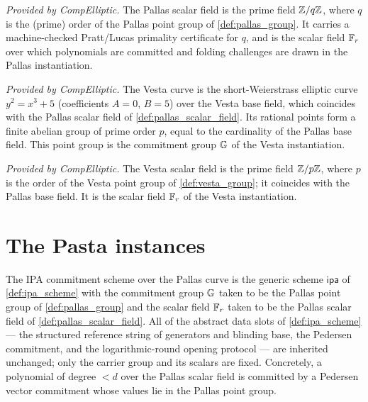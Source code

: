 \begin{definition}
  \label{def:pallas_scalar_field}
  \mathlibok
  \textit{Provided by CompElliptic.}
  The Pallas scalar field is the prime field \(\mathbb{Z}/q\mathbb{Z}\), where \(q\) is the
  (prime) order of the Pallas point group of \cref{def:pallas_group}. It carries a
  machine-checked Pratt/Lucas primality certificate for \(q\), and is the scalar
  field \(\mathbb{F}_r\) over which polynomials are committed and folding challenges are
  drawn in the Pallas instantiation.
\end{definition}

\begin{definition}
  \label{def:vesta_group}
  \mathlibok
  \textit{Provided by CompElliptic.}
  The Vesta curve is the short-Weierstrass elliptic curve \(y^{2} = x^{3} + 5\)
  (coefficients \(A = 0\), \(B = 5\)) over the Vesta base field, which coincides
  with the Pallas scalar field of \cref{def:pallas_scalar_field}. Its rational
  points form a finite abelian group of prime order \(p\), equal to the cardinality
  of the Pallas base field. This point group is the commitment group \(\mathbb{G}\) of the
  Vesta instantiation.
\end{definition}

\begin{definition}
  \label{def:vesta_scalar_field}
  \mathlibok
  \textit{Provided by CompElliptic.}
  The Vesta scalar field is the prime field \(\mathbb{Z}/p\mathbb{Z}\), where \(p\) is the order
  of the Vesta point group of \cref{def:vesta_group}; it coincides with the Pallas
  base field. It is the scalar field \(\mathbb{F}_r\) of the Vesta instantiation.
\end{definition}

\section{The Pasta instances}

\begin{definition}
  \label{def:ipa_pallas}
  The IPA commitment scheme over the Pallas curve is the generic scheme
  \(\textsf{ipa}\) of \cref{def:ipa_scheme} with the commitment group \(\mathbb{G}\) taken
  to be the Pallas point group of \cref{def:pallas_group} and the scalar field
  \(\mathbb{F}_r\) taken to be the Pallas scalar field of \cref{def:pallas_scalar_field}.
  All of the abstract data slots of \cref{def:ipa_scheme} — the structured
  reference string of generators and blinding base, the Pedersen commitment, and
  the logarithmic-round opening protocol — are inherited unchanged; only the
  carrier group and its scalars are fixed. Concretely, a polynomial of degree
  \(< d\) over the Pallas scalar field is committed by a Pedersen vector commitment
  whose values lie in the Pallas point group.
\end{definition}


